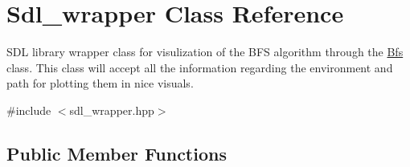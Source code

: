 \hypertarget{class_sdl__wrapper}{}\section{Sdl\+\_\+wrapper Class Reference}
\label{class_sdl__wrapper}


S\+DL library wrapper class for visulization of the B\+FS algorithm through the \hyperlink{class_bfs}{Bfs} class. This class will accept all the information regarding the environment and path for plotting them in nice visuals.  




{\ttfamily \#include $<$sdl\+\_\+wrapper.\+hpp$>$}

\subsection*{Public Member Functions}
